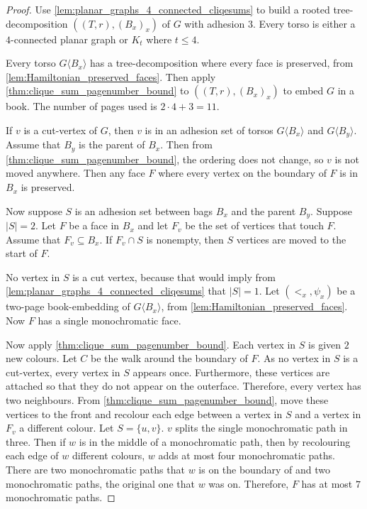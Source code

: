 \begin{proof}
	Use \cref{lem:planar_graphs_4_connected_cliqesums} to build a rooted tree-decomposition $((T,r), (B_x)_x)$ of $G$ with adhesion $3$. Every torso is either a $4$-connected planar graph or $K_t$ where $t \leq 4$.
	
	Every torso $G \langle B_x \rangle$ has a tree-decomposition where every face is preserved, from \cref{lem:Hamiltonian_preserved_faces}. Then apply \cref{thm:clique_sum_pagenumber_bound} to $((T,r), (B_x)_x)$ to embed $G$ in a book. The number of pages used is $2 \cdot 4 + 3 = 11$. 

	If $v$ is a cut-vertex of $G$, then $v$ is in an adhesion set of torsos $G \langle B_x \rangle$ and $G \langle B_y \rangle$. Assume that $B_y$ is the parent of $B_x$. Then from \cref{thm:clique_sum_pagenumber_bound}, the ordering does not change, so $v$ is not moved anywhere. Then any face $F$ where every vertex on the boundary of $F$ is in $B_x$ is preserved. 

	Now suppose $S$ is an adhesion set between bags $B_x$ and the parent $B_y$. Suppose $ |S| = 2$. Let $F$ be a face in $B_x$ and let $F_v$ be the set of vertices that touch $F$. Assume that $F_v \subseteq B_x$. If $F_v \cap S$ is nonempty, then $S$ vertices are moved to the start of $F$. 
	
	No vertex in $S$ is a cut vertex, because that would imply from \cref{lem:planar_graphs_4_connected_cliqesums} that $|S| = 1$. Let $(<_x, \psi_x)$ be a two-page book-embedding of $G \langle B_x \rangle$, from \cref{lem:Hamiltonian_preserved_faces}. Now $F$ has a single monochromatic face.
	
	Now apply \cref{thm:clique_sum_pagenumber_bound}. Each vertex in $S$ is given $2$ new colours. Let $C$ be the walk around the boundary of $F$. As no vertex in $S$ is a cut-vertex, every vertex in $S$ appears once. Furthermore, these vertices are attached so that they do not appear on the outerface. Therefore, every vertex has two neighbours. From \cref{thm:clique_sum_pagenumber_bound}, move these vertices to the front and recolour each edge between a vertex in $S$ and a vertex in $F_v$ a different colour. Let $S = \{u,v\}$. $v$ splits the single monochromatic path in three. Then if $w$ is in the middle of a monochromatic path, then by recolouring each edge of $w$ different colours, $w$ adds at most four monochromatic paths. There are two monochromatic paths that $w$ is on the boundary of and two monochromatic paths, the original one that $w$ was on. Therefore, $F$ has at most $7$ monochromatic paths.


\end{proof}
